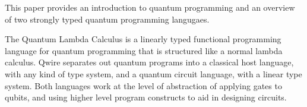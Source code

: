This paper provides an introduction to quantum programming and an overview of two strongly typed quantum programming langugaes.

The Quantum Lambda Calculus is a linearly typed functional programming language for quantum programming that is structured like a normal lambda calculus.
Qwire separates out quantum programs into a classical host language, with any kind of type system, and a quantum circuit language, with a linear type system.
Both languages work at the level of abstraction of applying gates to qubits, and using higher level program constructs to aid in designing circuits.